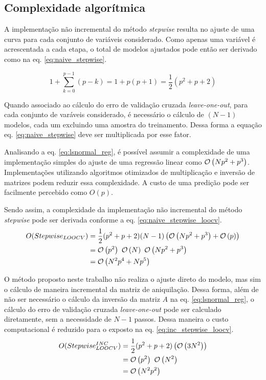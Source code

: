 \subsection{Complexidade algorítmica}

A implementação não incremental do método \textit{stepwise} resulta no ajuste de uma curva para cada conjunto de variáveis considerado. Como apenas uma variável é acrescentada a cada etapa, o total de modelos ajustados pode então ser derivado como na eq. \ref{eq:naive_stepwise}.

\begin{equation}
    1 + \sum^{p-1}_{k=0} (p-k) = 1+p(p+1) = \frac{1}{2}(p^2+p+2)
    \label{eq:naive_stepwise} 
\end{equation}

Quando associado ao cálculo do erro de validação cruzada \textit{leave-one-out}, para cada conjunto de varáveis considerado, é necessário o cálculo de $(N-1)$ modelos, cada um excluindo uma amostra do treinamento. Dessa forma a equação eq. \ref{eq:naive_stepwise} deve ser multiplicada por esse fator.

Analisando a eq. \ref{eq:lsnormal_reg}, é possível assumir a complexidade de uma implementação simples do ajuste de uma regressão linear como $\mathcal{O}\left(Np^2 + p^3\right)$. Implementações utilizando algoritmos otimizados de multiplicação e inversão de matrizes podem reduzir essa complexidade. A custo de uma predição pode ser facilmente percebido como $O(p)$.

Sendo assim, a complexidade da implementação não incremental do método \textit{stepwise} pode ser derivada conforme a eq. \ref{eq:naive_stepwise_loocv}.
\begin{equation}
    \begin{split}
        O(Stepwise_{LOOCV}) &= \frac{1}{2}(p^2+p+2)(N-1)\left( \mathcal{O}\left(Np^2 + p^3\right)+\mathcal{O}\left(p\right)\right) \\
                            &= \mathcal{O}\left(p^2\right)\ \mathcal{O}\left(N\right)\ \mathcal{O}\left(Np^2 + p^3\right) \\
                            &= \mathcal{O}\left(N^2p^4 + Np^5\right)
    \end{split}
    \label{eq:naive_stepwise_loocv}
\end{equation}

O método proposto neste trabalho não realiza o ajuste direto do modelo, mas sim o cálculo de maneira incremental da matriz de aniquilação. Dessa forma, além de não ser necessário o cálculo da inversão da matriz $A$ na eq. \ref{eq:lsnormal_reg}, o cálculo do erro de validação cruzada \textit{leave-one-out} pode ser calculado diretamente, sem a necessidade de $N-1$ passos. Dessa maneira o custo computacional é reduzido para o exposto na eq. \ref{eq:inc_stepwise_loocv}.
\begin{equation}
    \begin{split}
        O(Stepwise_{LOOCV}^{INC}) &= \frac{1}{2}(p^2+p+2)\left( \mathcal{O}\left(3 N^2\right)\right)\\
                            &= \mathcal{O}\left(p^2\right)\ \mathcal{O}\left(N^2\right) \\
                            &= \mathcal{O}\left(N^2p^2\right)
    \end{split}
    \label{eq:inc_stepwise_loocv}
\end{equation}

